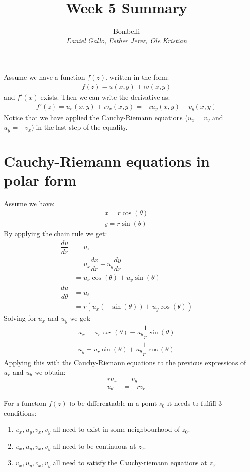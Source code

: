 \documentclass{report}
\title{Week 5 Summary}
\author{
    Bombelli \\
    \textit{Daniel Gallo, Esther Jerez, Ole Kristian}
}
\begin{document}
    \maketitle
    \noindent
    Assume we have a function $f(z)$, written in the form:
    \begin{align*}
        f(z) = u(x,y) + iv(x,y)
    \end{align*}
    and $f'(x)$ exists. Then we can write the derivative as:
    \begin{align*}
        f'(z) = u_x(x,y) + iv_x(x,y) = -iu_y(x,y) + v_y(x,y)
    \end{align*}
    Notice that we have applied the Cauchy-Riemann equations ($u_x = v_y$ and $u_y = -v_x$) in the last step of the equality.
    
    \section*{Cauchy-Riemann equations in polar form}
    Assume we have:
    \begin{align*}
        x = r\cos(\theta) \\
        y = r\sin(\theta)
    \end{align*}
    By applying the chain rule we get:
    \begin{align*}
        \dfrac{du}{dr} &= u_r \\ &= u_x\dfrac{dx}{dr} + u_y\dfrac{dy}{dr} \\ &= u_x\cos(\theta)+u_y\sin(\theta) \\
        \dfrac{du}{d\theta} &= u_\theta \\ &= r(u_x(-\sin(\theta)) + u_y\cos(\theta))
    \end{align*}
    Solving for $u_x$ and $u_y$ we get:
    \begin{align*}
        u_x = u_r\cos(\theta) - u_\theta\dfrac{1}{r}\sin(\theta) \\
        u_y = u_r\sin(\theta) + u_\theta\dfrac{1}{r}\cos(\theta)
    \end{align*}
    Applying this with the Cauchy-Riemann equations to the previous expressions of $u_r$ and $u_\theta$ we obtain:
    \begin{align*}
        ru_r &= v_\theta \\ u_\theta &= -rv_r
    \end{align*}
    \begin{tcolorbox}[title=Theorem]
        For a function $f(z)$ to be differentiable in a point $z_0$ it needs to fulfill 3 conditions:
        \begin{enumerate}
            \item $u_x, u_y, v_x, v_y$ all need to exist in some neighbourhood of $z_0$.
            \item $u_x, u_y, v_x, v_y$ all need to be continuous at $z_0$.
            \item $u_x, u_y, v_x, v_y$ all need to satisfy the Cauchy-riemann equations at $z_0$.
        \end{enumerate}
    \end{tcolorbox}
\end{document}
